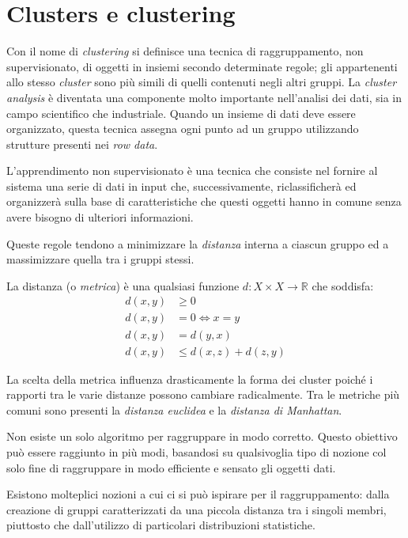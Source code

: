 \chapter{Clusters e clustering}
	Con il nome di \emph{clustering} si definisce una tecnica di raggruppamento, non supervisionato, di oggetti in insiemi secondo determinate regole; gli appartenenti allo stesso \emph{cluster} sono più simili di quelli contenuti negli altri gruppi. La \emph{cluster analysis} è diventata una componente molto importante nell'analisi dei dati, sia in campo scientifico che industriale. Quando un insieme di dati deve essere organizzato, questa tecnica assegna ogni punto ad un gruppo utilizzando strutture presenti nei \emph{row data}.

	L'apprendimento non supervisionato è una tecnica che consiste nel fornire al sistema una serie di dati in input che, successivamente, riclassificherà ed organizzerà sulla base di caratteristiche che questi oggetti hanno in comune senza avere bisogno di ulteriori informazioni\cite{apprendimento_non_supervisionato}.

	Queste regole tendono a minimizzare la \emph{distanza} interna a ciascun gruppo ed a massimizzare quella tra i gruppi stessi.

	La distanza (o \emph{metrica}) è una qualsiasi funzione $d:X \times X \to \mathbb{R}$ che soddisfa\cite{definizione_di_distanza}:
	\begin{align*}
		d(x,y) &\geq 0 \\
		d(x,y) &= 0 \iff x=y \\
		d(x,y) &= d(y,x) \\
		d(x,y) &\leq d(x,z) + d(z,y)
	\end{align*}

	La scelta della metrica influenza drasticamente la forma dei cluster poiché i rapporti tra le varie distanze possono cambiare radicalmente. Tra le metriche più comuni sono presenti la \emph{distanza euclidea} e la \emph{distanza di Manhattan}\cite{metriche}.

	Non esiste un solo algoritmo per raggruppare in modo corretto. Questo obiettivo può essere raggiunto in più modi, basandosi su qualsivoglia tipo di nozione col solo fine di raggruppare in modo efficiente e sensato gli oggetti dati. 

	Esistono molteplici nozioni a cui ci si può ispirare per il raggruppamento: dalla creazione di gruppi caratterizzati da una piccola distanza tra i singoli membri, piuttosto che dall'utilizzo di particolari distribuzioni statistiche.

